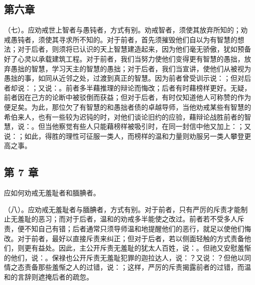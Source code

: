 
\subsection{第六章}

\par

（七）。应劝戒世上智者与愚钝者，方式有别。劝戒智者，须使其放弃所知的；劝戒愚钝者，须使其寻求所不知的。对于前者，首先须摧毁他们自以为有智慧的想法；对于后者，则须将已认识的天上智慧建造起来，因为他们毫无骄傲，犹如预备好了心灵以承载建筑工程。对于前者，我们当努力使他们变得更有智慧的愚拙，放弃愚拙的智慧，学习天主的智慧的愚拙；对于后者，我们当宣讲，使他们从被视为愚拙的事，如同从近邻之处，过渡到真正的智慧。因为前者曾受训示说：；但对后者却说：；又说：。前者多半藉推理的辩论而悔改；后者有时藉榜样更好。无疑，前者因在己方的论断中被驳倒而获益；但对于后者，有时仅知道他人可称赞的作为便足矣。为此，那位欠了有智慧的和愚拙者债的卓越导师，当他劝戒某些有智慧的希伯来人，也有一些较为迟钝的时，对他们谈论旧约的应验，藉辩论战胜前者的智慧，说：。但当他察觉有些人只能藉榜样被吸引时，在同一封信中他又加上：；又说：；如此，得胜的理性可征服一类人，而榜样的温和力量则劝服另一类人攀登更高之事。\par


\subsection{第 7 章}

应如何劝戒无羞耻者和腼腆者。\par

（八）。应劝戒无羞耻者与腼腆者，方式有别。对于前者，只有严厉的斥责才能制止无羞耻的恶习；而对于后者，温和的劝戒多半能使之改过。前者若不受多人斥责，便不知自己有错；后者通常只须导师温和地提醒他们的恶行，就足以使他们悔改。对于前者，最好以直接斥责来纠正；但对于后者，若以侧面轻触的方式责备他们，则更有益处。因此，主公开斥责无羞耻的犹太人百姓，说：。但祂又安慰羞惭的他们，说：。保禄也公开斥责无羞耻犯罪的迦拉达人，说：？又说：？但他以同情之态责备那些羞惭之人的过错，说：；这样，严厉的斥责揭露前者的过错，而温和的言辞则遮掩后者的疏忽。\par

